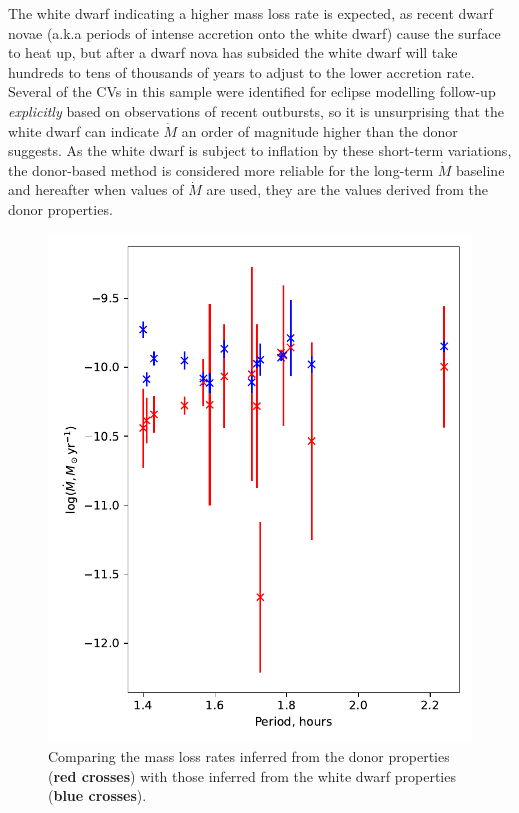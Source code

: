 The white dwarf indicating a higher mass loss rate is expected, as recent dwarf novae (a.k.a periods of intense accretion onto the white dwarf) cause the surface to heat up, but after a dwarf nova has subsided the white dwarf will take hundreds to tens of thousands of years to adjust to the lower accretion rate.
Several of the CVs in this sample were identified for eclipse modelling follow-up \textit{explicitly} based on observations of recent outbursts, so it is unsurprising that the white dwarf can indicate $\dot M$ an order of magnitude higher than the donor suggests. As the white dwarf is subject to inflation by these short-term variations, the donor-based method is considered more reliable for the long-term $\dot M$ baseline and hereafter when values of $\dot M$ are used, they are the values derived from the donor properties.
\begin{figure}
    \centering
    \includegraphics[width=\textwidth]{figures/results/Mdot/compare_mdot_from_donor_vs_wd_vs_period.pdf}
    \caption{Comparing the mass loss rates inferred from the donor properties ({\bf red crosses}) with those inferred from the white dwarf properties ({\bf blue crosses}).}
    \label{fig:discussion:compare Mdot from donor and WD}
\end{figure}


